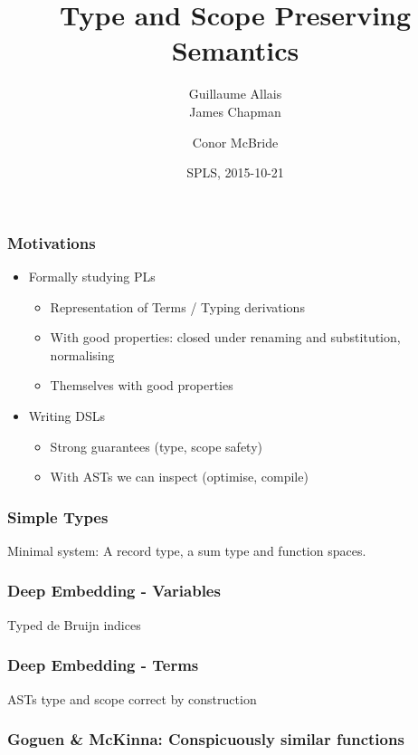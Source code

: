 \documentclass[xetex, mathserif, serif]{beamer}
\title{Type and Scope Preserving Semantics}
\author[me]{Guillaume Allais\\[1em] James Chapman \and Conor McBride}
\institute{University of Strathclyde}
\date{SPLS, 2015-10-21}
\begin{document}
 
  \begin{frame}
    \titlepage
  \end{frame}

  \begin{frame}\frametitle{Motivations}
    \begin{itemize}
      \item Formally studying PLs
      \begin{itemize}
        \item Representation of Terms / Typing derivations
        \item With good properties: closed under renaming and substitution, normalising
        \item Themselves with good properties
      \end{itemize}
      \item Writing DSLs
      \begin{itemize}
        \item Strong guarantees (type, scope safety)
        \item With ASTs we can inspect (optimise, compile)
      \end{itemize}  
    \end{itemize}
  \end{frame}
  
  \begin{frame}\frametitle{Simple Types}
    Minimal system: A record type, a sum type and function spaces.

    \unskip
    \unskip
  \end{frame}

  \begin{frame}\frametitle{Deep Embedding - Variables}
    Typed de Bruijn indices

    \unskip
  \end{frame}
  \begin{frame}\frametitle{Deep Embedding - Terms}
    ASTs type and scope correct by construction

    \unskip
  \end{frame}

  \begin{frame}\frametitle{Goguen \& McKinna: Conspicuously similar functions}
    \unskip
    \unskip
  \end{frame}
\end{document}
